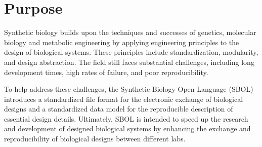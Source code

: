 \section{Purpose}



Synthetic biology builds upon the techniques and successes of genetics, molecular biology and metabolic engineering by applying engineering principles to the design of biological systems. These principles include standardization, modularity, and design abstraction. The field still faces substantial challenges, including long development times, high rates of failure, and poor reproducibility.

To help address these challenges, the Synthetic Biology Open Language (SBOL) introduces  a standardized file format for the electronic exchange of biological designs and a standardized data model for the reproducible description of essential design details. Ultimately, SBOL is intended to speed up the research and development of designed biological systems by enhancing the exchange and reproducibility of biological designs between different labs.   



